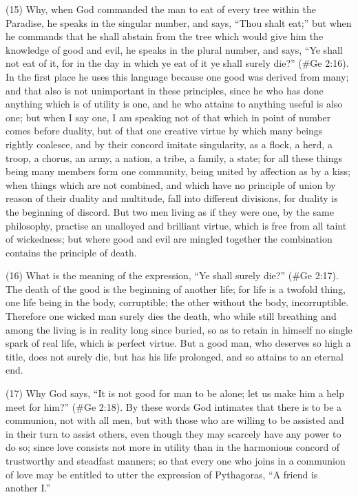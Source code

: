 (15) Why, when God commanded the man to eat of every tree within the Paradise, he speaks in
the singular number, and says, ``Thou shalt eat;'' but when he commands that he shall abstain from
the tree which would give him the knowledge of good and evil, he speaks in the plural number, and
says, ``Ye shall not eat of it, for in the day in which ye eat of it ye shall surely die?'' (\#Ge 2:16).
In the first place he uses this language because one good was derived from many; and that also is
not unimportant in these principles, since he who has done anything which is of utility is one, and he
who attains to anything useful is also one; but when I say one, I am speaking not of that which in
point of number comes before duality, but of that one creative virtue by which many beings rightly
coalesce, and by their concord imitate singularity, as a flock, a herd, a troop, a chorus, an army, a
nation, a tribe, a family, a state; for all these things being many members form one community,
being united by affection as by a kiss; when things which are not combined, and which have no
principle of union by reason of their duality and multitude, fall into different divisions, for duality is
the beginning of discord. But two men living as if they were one, by the same philosophy, practise
an unalloyed and brilliant virtue, which is free from all taint of wickedness; but where good and evil
are mingled together the combination contains the principle of death.

(16) What is the meaning of the expression, ``Ye shall surely die?'' (\#Ge 2:17). The death of
the good is the beginning of another life; for life is a twofold thing, one life being in the body,
corruptible; the other without the body, incorruptible. Therefore one wicked man surely dies the
death, who while still breathing and among the living is in reality long since buried, so as to retain in
himself no single spark of real life, which is perfect virtue. But a good man, who deserves so high a
title, does not surely die, but has his life prolonged, and so attains to an eternal end.

(17) Why God says, ``It is not good for man to be alone; let us make him a help meet for him?''
(\#Ge 2:18). By these words God intimates that there is to be a communion, not with all men,
but with those who are willing to be assisted and in their turn to assist others, even though they may
scarcely have any power to do so; since love consists not more in utility than in the harmonious
concord of trustworthy and steadfast manners; so that every one who joins in a communion of love
may be entitled to utter the expression of Pythagoras, ``A friend is another I.''


